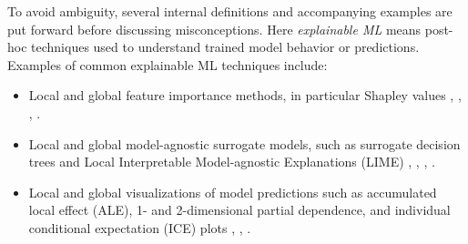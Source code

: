 \documentclass[fleqn]{article}
\begin{document}

To avoid ambiguity, several internal definitions and accompanying examples are put forward before discussing misconceptions. Here \textit{explainable ML} means post-hoc techniques used to understand trained model behavior or predictions. Examples of common explainable ML techniques include:

\begin{itemize}
\item Local and global feature importance methods, in particular Shapley values \cite{shapley1988shapley}, \cite{keinan2004fair}, \cite{kononenko2010efficient}, \cite{shapley}.
\item Local and global model-agnostic surrogate models, such as surrogate decision trees and Local Interpretable Model-agnostic Explanations (LIME) \cite{dt_surrogate1}, \cite{dt_surrogate2}, \cite{lime-sup}, \cite{lime}. 
\item Local and global visualizations of model predictions such as accumulated local effect (ALE), 1- and 2-dimensional partial dependence, and individual conditional expectation (ICE) plots \cite{ale_plot}, \cite{esl}, \cite{ice_plots}.
\end{itemize}  
\end{document}
